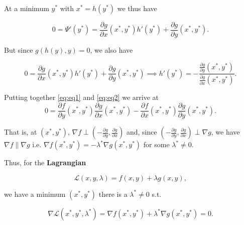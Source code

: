 \documentclass[12pt]{scrartcl}
\begin{document}
At a minimum $y^\ast$ with $x^\ast = h(y^\ast)$ we thus have

\begin{equation}
    \label{eq:eq1}
    0 = \Psi ' (y^\ast) = \frac{\partial g}{\partial x}(x^\ast, y^\ast) h'(y^\ast) + \frac{\partial g}{\partial y}(x^\ast, y^\ast).
\end{equation}

But since $g(h(y), y) = 0$, we also have

\begin{equation}
    \label{eq:eq2}
    0 = \frac{\partial g}{\partial x}(x^\ast, y^\ast) h'(y^\ast) + \frac{\partial g}{\partial y}(x^\ast, y^\ast) 
    \implies h'(y^\ast) = -\frac{\frac{\partial g}{\partial y}(x^\ast, y^\ast)}{\frac{\partial g}{\partial x}(x^\ast, y^\ast)}.
\end{equation}

Putting together \ref{eq:eq1} and \ref{eq:eq2} we arrive at
\begin{equation*}
    0 = \frac{\partial f}{\partial y}(x^\ast, y^\ast) \frac{\partial g}{\partial x}(x^\ast, y^\ast) - \frac{\partial f}{\partial x}(x^\ast, y^\ast) \frac{\partial g}{\partial y}(x^\ast, y^\ast) .
\end{equation*}

That is, at $(x^\ast, y^\ast)$, $\nabla f \perp \left( - \frac{\partial g}{\partial y}, \frac{\partial g}{\partial x}\right) $ and, since 
$\left( - \frac{\partial g}{\partial y}, \frac{\partial g}{\partial x}\right) \perp \nabla g $, we have $\nabla f \| \nabla g$ i.e.
$\nabla f(x^\ast, y^\ast) = - \lambda^\ast \nabla g(x^\ast, y^\ast)$ for some $\lambda^\ast \neq 0$.

\vspace{0.5em}

Thus, for the \textbf{Lagrangian}

\begin{equation*}
    \mathcal{L}(x, y, \lambda) = f(x, y) + \lambda g(x, y),
\end{equation*}

we have a minimum $(x^\ast, y^\ast)$ there is a $\lambda^\ast \neq 0$ s.t.

\begin{equation*}
    \nabla \mathcal{L}(x^\ast, y^\ast, \lambda^\ast) = \nabla f(x^\ast, y^\ast) + \lambda^\ast \nabla g(x^\ast, y^\ast) = 0.
\end{equation*}
\end{document}
